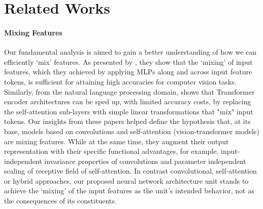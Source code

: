 \documentclass{article}
\begin{document}
\section{Related Works}
\paragraph{Mixing Features} 
Our fundamental analysis is aimed to gain a better understanding of how we can efficiently `mix' features. As presented by \cite{DBLP:journals/corr/MLP-Mixer}, they show that the `mixing' of input features, which they achieved by applying MLPs along and across input feature tokens, is sufficient for attaining high accuracies for computer vision tasks. Similarly, from the natural language processing domain, \cite{DBLP:journals/corr/FNet} shows that Transformer encoder architectures can be sped up, with limited accuracy costs, by replacing the self-attention sub-layers with simple linear transformations that "mix" input tokens. Our insights from these papers helped define the hypothesis that, at its base, models based on convolutions \cite{AlexNet, DBLP:journals/corr/ResNet, DBLP:journals/corr/efficient-net, DSF-CNN} and self-attention (vision-transformer models) \cite{ViT, DBLP:journals/corr/Deit, DBLP:journals/corr/pvt, DBLP:journals/corr/cait} are mixing features. While at the same time, they augment their output representation with their specific functional advantages, for example, input-independent invariance properties of convolutions and parameter independent scaling of receptive field of self-attention. In contrast convolutional, self-attention or hybrid approaches, our proposed neural network architecture unit stands to achieve the `mixing' of the input features as the unit's intended behavior, not as the consequences of its constituents. 
\end{document}
